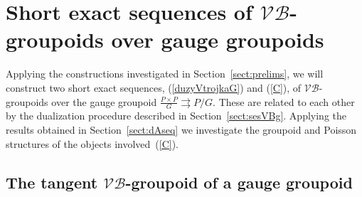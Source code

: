 \documentclass[pdftex]{sigma}
\newcommand{\tto}{\rightrightarrows}
\numberwithin{equation}{section}
\begin{document}
\section[Short exact sequences of $\mathcal{V}\!\mathcal{B}$-groupoids over gauge groupoids]{Short exact sequences of $\boldsymbol{\mathcal{V}\!\mathcal{B}}$-groupoids over gauge groupoids}\label{sect:VBgauge}

Applying the constructions investigated in Section~\ref{sect:prelims}, we will construct two short exact sequences, (\ref{duzyVtrojkaG}) and (\ref{C}), of $\mathcal{V}\!\mathcal{B}$-groupoids over the gauge groupoid $\frac{P\times P}{G}\tto P/G$. These are related to each other by the dualization procedure described in Section~\ref{sect:sesVBg}. Applying the results obtained in Section~\ref{sect:dAseq} we investigate the groupoid and Poisson structures of the objects involved~(\ref{C}).

\subsection[The tangent $\mathcal{V}\!\mathcal{B}$-groupoid of a gauge groupoid]{The tangent $\boldsymbol{\mathcal{V}\!\mathcal{B}}$-groupoid of a gauge groupoid}
\end{document}
